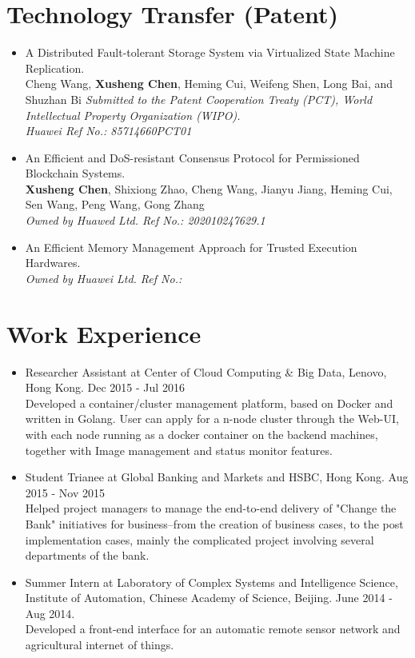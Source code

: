 \documentclass[a4paper,8pt]{article} %
\newcommand{\authors}[1]{{\small \fontfamily{cmss}\selectfont #1}}
\newcommand{\conference}[1]{\textit{\small \fontfamily{cmss}\selectfont #1}}
\newcommand{\info}[1]{{\footnotesize \fontfamily{cmss}\selectfont #1}}
\begin{document}
\section{Technology Transfer (Patent)}
\begin{itemize}
\item A Distributed Fault-tolerant Storage System via Virtualized State Machine
Replication. \\
\authors{Cheng Wang, \textbf{Xusheng Chen}, Heming Cui, Weifeng Shen, Long Bai, and Shuzhan Bi}
\conference{Submitted to the Patent Cooperation Treaty (PCT), World Intellectual
Property Organization (WIPO). \\Huawei Ref No.: 85714660PCT01} \\

\item An Efficient and DoS-resistant Consensus Protocol for Permissioned Blockchain Systems.\\
\authors{\textbf{Xusheng Chen}, Shixiong Zhao, Cheng Wang, Jianyu Jiang, Heming Cui, Sen Wang, Peng Wang, Gong Zhang}\\
\conference{Owned by Huawed Ltd. Ref No.: 202010247629.1} \\

\item An Efficient Memory Management Approach for Trusted Execution Hardwares. \\
\conference{Owned by Huawei Ltd. Ref No.: }
\end{itemize}

\section{Work Experience}


\begin{itemize}
\item Researcher Assistant at Center of Cloud Computing \& Big Data, Lenovo, Hong Kong. Dec 2015 - Jul 2016 \\
\info{Developed a container/cluster management platform, based on Docker and written in Golang. User can apply for a n-node cluster through the Web-UI, with each node running as a docker container on the backend machines, together with Image management and status monitor features.} \\


\item Student Trianee at Global Banking and Markets and HSBC, Hong Kong. Aug 2015 - Nov 2015 \\ 
\info{Helped project managers to manage the end-to-end delivery of "Change the Bank" initiatives for business--from the creation of business cases, to the post implementation cases, mainly the complicated project involving several departments of the bank.}\\


\item Summer Intern at Laboratory of Complex Systems and Intelligence Science,
Institute of Automation, Chinese Academy of Science, Beijing. 
June 2014 - Aug 2014.\\
\info{Developed a front-end interface for an automatic remote sensor network and agricultural internet of things}.
\end{itemize}
\end{document}
